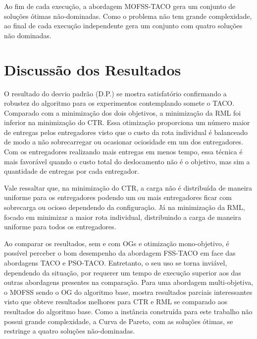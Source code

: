 Ao fim de cada execução, a abordagem MOFSS-TACO gera um conjunto de soluções ótimas não-dominadas. Como o problema não tem grande complexidade, ao final de cada execução independente gera um conjunto com quatro soluções não dominadas.

\section{Discussão dos Resultados}

O resultado do desvio padrão (D.P.) se mostra satisfatório confirmando a robustez do algoritmo para os experimentos contemplando somete o TACO. Comparado com a minimização dos dois objetivos, a minimização da RML foi inferior na minimização do CTR. Essa otimização proporciona um número maior de entregas pelos entregadores visto que o custo da rota individual é balanceado de modo a não sobrecarregar ou ocasionar ociosidade em um dos entregadores. Com os entregadores realizando mais entregas em menos tempo, essa técnica é mais favorável quando o custo total do deslocamento não é o objetivo, mas sim a quantidade de entregas por cada entregador.

Vale ressaltar que, na minimização do CTR, a carga não é distribuída de maneira uniforme para os entregadores podendo um ou mais entregadores ficar com sobrecarga ou ocioso dependendo da configuração. Já na minimização da RML, focado em minimizar a maior rota individual, distribuindo a carga de maneira uniforme para todos os entregadores.

Ao comparar os resultados, sem e com OGs e otimização mono-objetivo, é possível perceber o bom desempenho da abordagem FSS-TACO em face das abordagens TACO e PSO-TACO. Entretanto, o seu uso se torna inviável, dependendo da situação, por requerer um tempo de execução superior aos das outras abordagens presentes na comparação. Para uma abordagem multi-objetiva, o MOFSS sendo o OG do algoritmo base, mostra resultados parciais interessantes visto que obteve resultados melhores para CTR e RML se comparado aos resultados do algoritmo base. Como a instância construída para este trabalho não possui grande complexidade, a Curva de Pareto, com as soluções ótimas, se restringe a quatro soluções não-dominadas.
